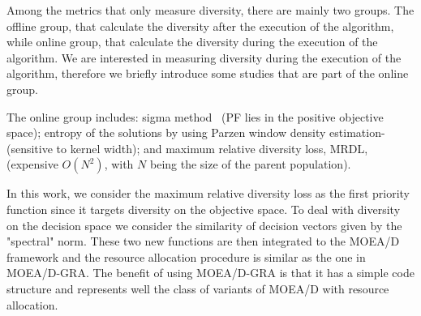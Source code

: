 Among the metrics that only measure diversity, there are mainly two groups. The offline group, that calculate the diversity after the execution of the algorithm, while online group, that calculate the diversity during the execution of the algorithm. We are interested in measuring diversity during the execution of the algorithm, therefore we  briefly introduce some studies that are part of the online group.
%

The online group includes: sigma method~\cite{mostaghim2003strategies}  (PF lies in the positive objective space); entropy of the solutions by using Parzen window density estimation-\cite{tan2008evolutionary} (sensitive to kernel width); and maximum relative diversity loss, MRDL, ~\cite{gee2015online} (expensive $O(N^2)$, with $N$ being the size of the parent population).

In this work, we consider the maximum relative diversity loss as the first priority function since it targets diversity on the objective space. To deal with diversity on the decision space we consider the similarity of decision vectors given by the "spectral" norm. These two new functions are then integrated to the MOEA/D framework and the resource allocation procedure is similar as the one in MOEA/D-GRA. The benefit of using MOEA/D-GRA is that it has a simple code structure and represents well the class of variants of MOEA/D with resource allocation.






